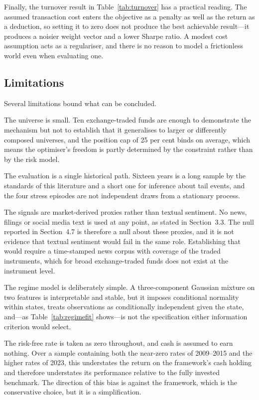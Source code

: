 \documentclass{singlecol-new}
\theoremstyle{TH}{
\newtheorem{lemma}{Lemma}
\newtheorem{theorem}[lemma]{Theorem}
\newtheorem{corrolary}[lemma]{Corrolary}
\newtheorem{conjecture}[lemma]{Conjecture}
\newtheorem{proposition}[lemma]{Proposition}
\newtheorem{claim}[lemma]{Claim}
\newtheorem{stheorem}[lemma]{Wrong Theorem}
\newtheorem{algorithm}{Algorithm}
}
\theoremstyle{THrm}{
\newtheorem{definition}{Definition}[section]
\newtheorem{question}{Question}[section]
\newtheorem{remark}{Remark}
\newtheorem{scheme}{Scheme}
}
\theoremstyle{THhit}{
\newtheorem{case}{Case}[section]
}
\begin{document}
Finally, the turnover result in Table~\ref{tab:turnover} has a practical reading. The assumed
transaction cost enters the objective as a penalty as well as the return as a
deduction, so setting it to zero does not produce the best achievable result---it
produces a noisier weight vector and a lower Sharpe ratio. A modest cost assumption acts
as a regulariser, and there is no reason to model a frictionless world even when
evaluating one.

\subsection{Limitations}

Several limitations bound what can be concluded.

The universe is small. Ten exchange-traded funds are enough to demonstrate the
mechanism but not to establish that it generalises to larger or differently composed
universes, and the position cap of 25 per cent binds on average, which means the
optimiser's freedom is partly determined by the constraint rather than by the risk
model.

The evaluation is a single historical path. Sixteen years is a long sample by the
standards of this literature and a short one for inference about tail events, and the
four stress episodes are not independent draws from a stationary process.

The signals are market-derived proxies rather than textual sentiment. No news, filings
or social media text is used at any point, as stated in Section~3.3. The null reported
in Section~4.7 is therefore a null about these proxies, and it is not evidence that
textual sentiment would fail in the same role. Establishing that would require a
time-stamped news corpus with coverage of the traded instruments, which for broad
exchange-traded funds does not exist at the instrument level.

The regime model is deliberately simple. A three-component Gaussian mixture on two
features is interpretable and stable, but it imposes conditional normality within
states, treats observations as conditionally independent given the state, and---as
Table~\ref{tab:regimefit} shows---is not the specification either information criterion would select.

The risk-free rate is taken as zero throughout, and cash is assumed to earn nothing.
Over a sample containing both the near-zero rates of 2009--2015 and the higher rates of
2023, this understates the return on the framework's cash holding and therefore
understates its performance relative to the fully invested benchmark. The direction of
this bias is against the framework, which is the conservative choice, but it is a
simplification.
\end{document}
